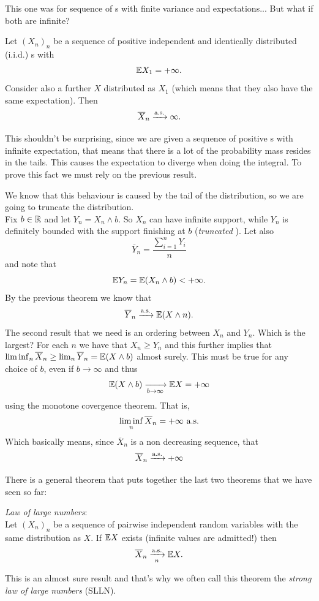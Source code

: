 \documentclass{report}
\begin{document}
This one was for sequence of \rv s with finite variance and expectations... But what if both are infinite?
\begin{proposition}
	Let ${(X_n)}_{n}$ be a sequence of positive independent and identically distributed (i.i.d.) \rv s with
	\[\mathbb{E} X_1=+\infty.\]
	Consider also a further \rv{} $X$ distributed as $X_1$ (which means that they also have the same expectation). Then
	\[\overline{X}_{n}\xrightarrow[]{\text{a.s.}}\infty.\]
	\end{proposition}
This shouldn't be surprising, since we are given a sequence of positive \rv s with infinite expectation, that means that there is a lot of the probability mass resides in the tails. This causes the expectation to diverge when doing the integral. To prove this fact we must rely on the previous result.
\begin{fancyproof}
	We know that this behaviour is caused 
	by the tail of the distribution, so we are going to truncate the distribution.\\
	Fix $b\in\mathbb{R}$ and let $Y_n=X_n\wedge b$. So $X_n$ can have infinite support, while $Y_n$ is definitely bounded with the support finishing at $b$ (\emph{truncated \rv}). Let also
	\[\overline{Y}_{n}=\frac{\sum_{i=1}^{n}Y_i}{n}\]
	and note that 
	\[\mathbb{E} Y_n=\mathbb{E}(X_n\wedge b)<+\infty.\]
	By the previous theorem we know that 
	\[\overline{Y}_{n}\xrightarrow[]{\text{a.s.}}\mathbb{E}(X\wedge n).\]
	The second result that we need is an ordering between $X_n$ and $Y_n$. Which is the largest? For each $n$ we have that $X_n\geq Y_n$ and this further implies that $\liminf_n\overline{X}_n\geq\lim_{n}\overline{Y}_{n}=\mathbb{E}(X\wedge b)$ almost surely. This must be true for any choice of $b$, even if $b\to\infty$ and thus
	\[\mathbb{E}(X\wedge b)\xrightarrow[b\to\infty]{}\mathbb{E} X=+\infty\]
	using the monotone covergence theorem. That is,
	\[\liminf_n\overline{X}_{n}=+\infty\text{ a.s.}\]
	Which basically means, since $\overline{X}_{n}$ is a non decreasing sequence, that
	\[\overline{X}_{n}\xrightarrow[]{\text{a.s.}} +\infty\]
\end{fancyproof}
There is a general theorem that puts together the last two theorems that we have seen so far:
\begin{theorem}
	\emph{Law of large numbers}:\\
	Let ${(X_n)}_{n}$ be a sequence of pairwise independent random variables with the same distribution as $X$. If $\mathbb{E} X$ exists (infinite values are admitted!) then
	\[\overline{X}_n\xrightarrow[n]{\mathrm{a.s.}}\mathbb{E} X.\]
\end{theorem}
This is an almost sure result and that's why we often call this theorem the \emph{strong law of large numbers} (SLLN).
\end{document}
